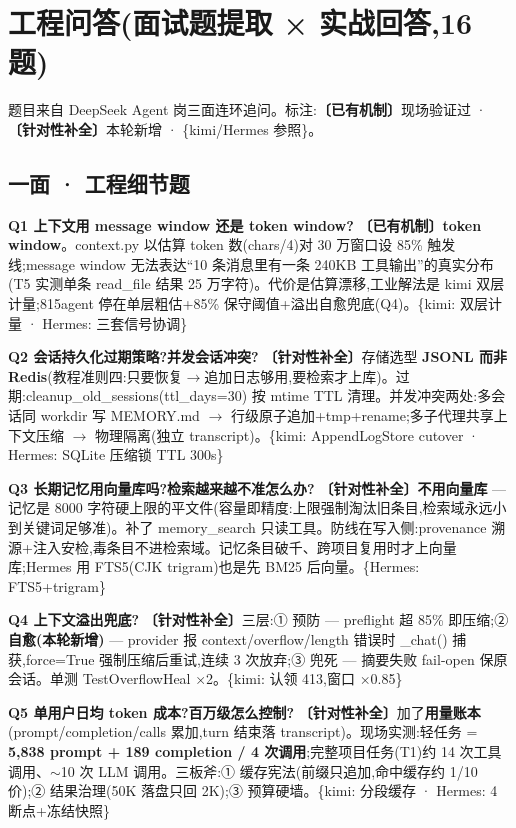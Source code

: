 \documentclass[10pt,a4paper]{article}
\renewcommand{\footnotesize}{\fontsize{7.5}{10.5}\selectfont}
\newcommand{\tagref}[1]{\textcolor{dimc}{\footnotesize\{#1\}}}
\begin{document}
\section{工程问答(面试题提取 × 实战回答,16 题)}

题目来自 DeepSeek Agent 岗三面连环追问。标注:\textcolor{okc}{\textbf{〔已有机制〕}}现场验证过 · \textcolor{acc}{\textbf{〔针对性补全〕}}本轮新增 · \textcolor{dimc}{\{kimi/Hermes 参照\}}。

\subsection{一面 · 工程细节题}
\textbf{Q1 上下文用 message window 还是 token window?} \textcolor{okc}{\textbf{〔已有机制〕}}\textbf{token window}。context.py 以估算 token 数(chars/4)对 30 万窗口设 85\% 触发线;message window 无法表达``10 条消息里有一条 240KB 工具输出''的真实分布(T5 实测单条 read\_file 结果 25 万字符)。代价是估算漂移,工业解法是 kimi 双层计量;815agent 停在单层粗估+85\% 保守阈值+溢出自愈兜底(Q4)。\tagref{kimi: 双层计量 · Hermes: 三套信号协调}

\textbf{Q2 会话持久化过期策略?并发会话冲突?} \textcolor{acc}{\textbf{〔针对性补全〕}}存储选型 \textbf{JSONL 而非 Redis}(教程准则四:只要恢复$\to$追加日志够用,要检索才上库)。过期:cleanup\_old\_sessions(ttl\_days=30) 按 mtime TTL 清理。并发冲突两处:多会话同 workdir 写 MEMORY.md $\to$ 行级原子追加+tmp+rename;多子代理共享上下文压缩 $\to$ 物理隔离(独立 transcript)。\tagref{kimi: AppendLogStore cutover · Hermes: SQLite 压缩锁 TTL 300s}

\textbf{Q3 长期记忆用向量库吗?检索越来越不准怎么办?} \textcolor{acc}{\textbf{〔针对性补全〕}}\textbf{不用向量库} --- 记忆是 8000 字符硬上限的平文件(容量即精度:上限强制淘汰旧条目,检索域永远小到关键词足够准)。补了 memory\_search 只读工具。防线在写入侧:provenance 溯源+注入安检,毒条目不进检索域。记忆条目破千、跨项目复用时才上向量库;Hermes 用 FTS5(CJK trigram)也是先 BM25 后向量。\tagref{Hermes: FTS5+trigram}

\textbf{Q4 上下文溢出兜底?} \textcolor{acc}{\textbf{〔针对性补全〕}}三层:① 预防 --- preflight 超 85\% 即压缩;② \textbf{自愈(本轮新增)} --- provider 报 context/overflow/length 错误时 \_chat() 捕获,force=True 强制压缩后重试,连续 3 次放弃;③ 兜死 --- 摘要失败 fail-open 保原会话。单测 TestOverflowHeal ×2。\tagref{kimi: 认领 413,窗口 ×0.85}

\textbf{Q5 单用户日均 token 成本?百万级怎么控制?} \textcolor{acc}{\textbf{〔针对性补全〕}}加了\textbf{用量账本}(prompt/completion/calls 累加,turn 结束落 transcript)。现场实测:轻任务 = \textbf{5,838 prompt + 189 completion / 4 次调用};完整项目任务(T1)约 14 次工具调用、$\sim$10 次 LLM 调用。三板斧:① 缓存宪法(前缀只追加,命中缓存约 1/10 价);② 结果治理(50K 落盘只回 2K);③ 预算硬墙。\tagref{kimi: 分段缓存 · Hermes: 4 断点+冻结快照}
\end{document}
